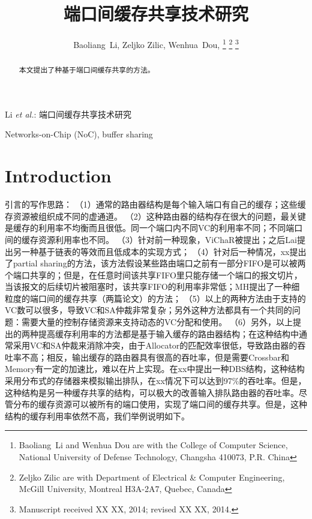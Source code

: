 \documentclass[10pt,journal]{IEEEtran}
\begin{document}
\title{端口间缓存共享技术研究}

\author{Baoliang~Li, %
        Zeljko Zilic, %
        Wenhua~Dou, %
\thanks{Baoliang~Li and Wenhua Dou are with the College of Computer Science, National University of Defense Technology, Changsha 410073, P.R. China}%
\thanks{Zeljko Zilic are with Department of Electrical \& Computer Engineering, McGill University, Montreal H3A-2A7, Quebec, Canada}%
\thanks{Manuscript received XX XX, 2014; revised XX XX, 2014.}}

%
{Li \MakeLowercase{\textit{et al.}}: 端口间缓存共享技术研究}

\maketitle

\begin{abstract}
本文提出了种基于端口间缓存共享的方法。
\end{abstract}
\begin{IEEEkeywords}
Networks-on-Chip (NoC), buffer sharing
\end{IEEEkeywords}

\section{Introduction}
引言的写作思路：
（1）通常的路由器结构是每个输入端口有自己的缓存；这些缓存资源被组织成不同的虚通道。
（2）这种路由器的结构存在很大的问题，最关键是缓存的利用率不均衡而且很低。同一个端口内不同VC的利用率不同；不同端口间的缓存资源利用率也不同。
（3）针对前一种现象，ViChaR被提出；之后Lai提出另一种基于链表的等效而且低成本的实现方式；
（4）针对后一种情况，xx提出了partial sharing的方法，该方法假设某些路由端口之前有一部分FIFO是可以被两个端口共享的；但是，在任意时间该共享FIFO里只能存储一个端口的报文切片，当该报文的后续切片被阻塞时，该共享FIFO的利用率非常低；MH提出了一种细粒度的端口间的缓存共享（两篇论文）的方法；
（5）以上的两种方法由于支持的VC数可以很多，导致VC和SA仲裁非常复杂；另外这种方法都具有一个共同的问题：需要大量的控制存储资源来支持动态的VC分配和使用。
（6）另外，以上提出的两种提高缓存利用率的方法都是基于输入缓存的路由器结构；在这种结构中通常采用VC和SA仲裁来消除冲突，由于Allocator的匹配效率很低，导致路由器的吞吐率不高；相反，输出缓存的路由器具有很高的吞吐率，但是需要Crossbar和Memory有一定的加速比，难以在片上实现。在xx中提出一种DBS结构，这种结构采用分布式的存储器来模拟输出排队，在xx情况下可以达到97\%的吞吐率。但是，这种结构是另一种缓存共享的结构，可以极大的改善输入排队路由器的吞吐率。尽管分布的缓存资源可以被所有的端口使用，实现了端口间的缓存共享。但是，这种结构的缓存利用率依然不高，我们举例说明如下。
\end{document}
